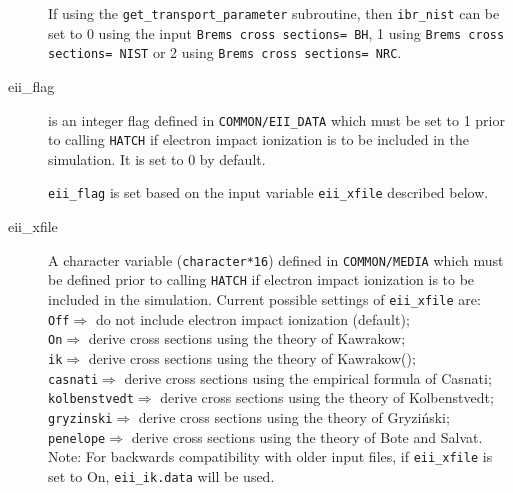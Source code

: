 \begin{description}
If using the {\tt get\_transport\_parameter} subroutine, then
 {\tt ibr\_nist} can be set to 0 using the input
{\tt Brems cross sections= BH}, 1 using
{\tt Brems cross sections= NIST} or 2 using
{\tt Brems cross sections= NRC}.

\item[eii\_flag] is an integer flag defined in {\tt COMMON/EII\_DATA}
which must be set to 1 prior to calling {\tt HATCH}
if electron impact ionization is to be included in the simulation.
It is set to 0 by default.

{\tt eii\_flag} is set based on the input variable {\tt eii\_xfile}
described below.

\label{eii_xfile_description}
\item[eii\_xfile] A character variable ({\tt character*16}) defined
in {\tt COMMON/MEDIA} which must be defined prior to calling {\tt HATCH}
if electron impact ionization is to be included in the simulation.
Current possible settings of {\tt eii\_xfile} are: \\
{\tt Off}\hspace{19.5mm}$\Rightarrow$ do not include electron impact ionization (default);\\
{\tt On}\hspace{21.8mm}$\Rightarrow$ derive cross sections using the theory of Kawrakow\cite{Ka02b};\\
{\tt ik}\hspace{21.8mm}$\Rightarrow$ derive cross sections using the theory of Kawrakow(\cite{Ka02b});\\
{\tt casnati}\hspace{10.5mm}$\Rightarrow$ derive cross sections using the empirical formula of Casnati\cite{Ca82,Ca83};\\
{\tt kolbenstvedt}$\Rightarrow$ derive cross sections using the theory of Kolbenstvedt\cite{Ko67};\\
{\tt gryzinski}\hspace{6.7mm}$\Rightarrow$ derive cross sections using the theory of Gryzi\'{n}ski\cite{Gr65a,Gr65b,Gr65c};\\
{\tt penelope}\hspace{9.1mm}$\Rightarrow$ derive cross sections using the theory of Bote and Salvat\cite{BS08}.\\
Note: For backwards compatibility with older input files, if
{\tt eii\_xfile} is set to On, {\tt eii\_ik.data} will be used.


\end{description}
